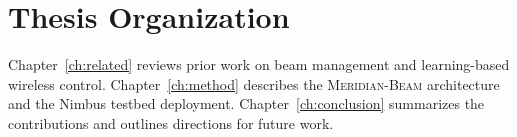 \section{Thesis Organization}
Chapter~\ref{ch:related} reviews prior work on beam management and
learning-based wireless control. Chapter~\ref{ch:method} describes the
\textsc{Meridian-Beam} architecture and the Nimbus testbed deployment.
Chapter~\ref{ch:conclusion} summarizes the contributions and outlines
directions for future work.
